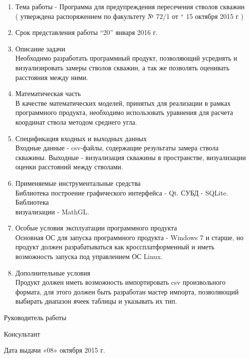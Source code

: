 \begin{enumerate}
  \item Тема работы - Программа для предупреждения пересечения стволов скважин\\
  ( утверждена  распоряжением  по  факультету  №  72/1    от “  15 октября   2015  г )
  \item Срок  представления  работы  “20”     января     2016  г.
  \item Описание задачи\\
    Необходимо разработать программный продукт, позволяющий усреднять и визуализировать замеры стволов скважин, а так же
    позволять оценивать расстояния между ними.
  \item Математическая часть\\
  В качестве математических моделей, принятых для реализации в рамках программного продукта,
  необходимо использовать уравнения для расчета координат ствола методом среднего угла.
  \item Спецификация входных и выходных данных\\
  Входные данные - csv-файлы, содержащие результаты замера ствола скважины. Выходные - визуализация скважины в пространстве, визуализации оценки расстояний
  между стволами.
  \item Применяемые инструментальные средства\\
  Библиотека построение графического интерфейса - Qt. СУБД - SQLite. Библиотека\\визуализации - MathGL.
  \item Особые условия эксплуатации программного продукта\\
  Основная ОС для запуска программного продукта - Windows 7 и старше, но продукт должен разрабатываться как кроссплатформенный и иметь возможность запуска
  под управлением ОС Linux.
  \item Дополнительные условия\\
  Продукт должен иметь возможность импортировать csv произвольного формата, для этого должен быть разработан мастер импорта, позволяющий
  выбирать диапазон ячеек таблицы и указывать их тип.
\end{enumerate}

\vspace{\fill}

Руководитель работы \underline{\hspace{5cm}}

Консультант \underline{\hspace{6.5cm}}
\begin{center}
  Дата  выдачи   «08»  октября       2015 г.
\end{center}
\newpage
